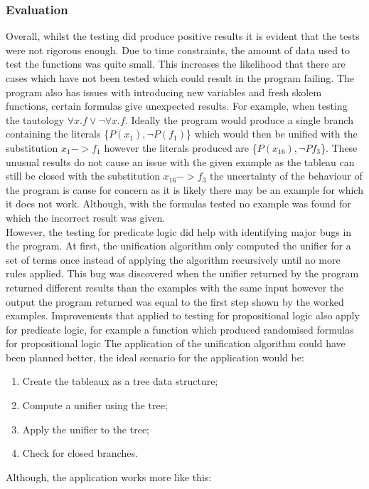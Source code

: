 \documentclass{article}%
\begin{document}
\subsubsection{Evaluation}
Overall, whilst the testing did produce positive results it is evident that the tests were not rigorous enough. Due to time constraints, the amount of data used to test the functions was quite small. This increases the likelihood that there are cases which have not been tested which could result in the program failing. The program also has issues with introducing new variables and fresh skolem functions, certain formulas give unexpected results. For example, when testing the tautology $\forall{x.f} \lor \neg\forall{x.f}$. Ideally the program would produce a single branch containing the literals \{$P(x_1), \neg{P(f_1)}$\} which would then be unified with the substitution $x_1->f_1$ however the literals produced are \{$P(x_16), \neg{Pf_3}$\}. These unusual results do not cause an issue with the given example as the tableau can still be closed with the substitution $x_16 -> f_3$ the uncertainty of the behaviour of the program is cause for concern as it is likely there may be an example for which it does not work. Although, with the formulas tested no example was found for which the incorrect result was given.\\
However, the testing for predicate logic did help with identifying major bugs in the program. At first, the unification algorithm only computed the unifier for a set of terms once instead of applying the algorithm recursively until no more rules applied. This bug was discovered when the unifier returned by the program returned different results than the examples \cite{struth_2019} with the same input however the output the program returned was equal to the first step shown by the worked examples. 
Improvements that applied to testing for propositional logic also apply for predicate logic, for example a function which produced randomised formulas for propositional logic
The application of the unification algorithm could have been planned better, the ideal scenario for the application would be:
\begin{enumerate}
\item Create the tableaux as a tree data structure;
\item Compute a unifier using the tree;
\item Apply the unifier to the tree;
\item Check for closed branches. 
\end{enumerate}
Although, the application works more like this: 
\end{document}
